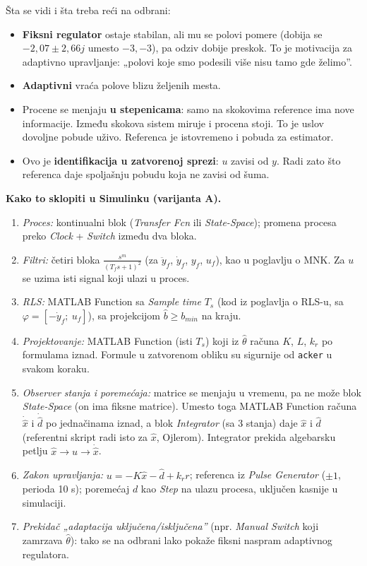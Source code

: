 \documentclass[11pt,a4paper,parskip=half,headsepline,numbers=noenddot]{scrartcl}
\begin{document}
Šta se vidi i šta treba reći na odbrani:

\begin{itemize}
\item \textbf{Fiksni regulator} ostaje stabilan, ali mu se polovi pomere (dobija se \(-2{,}07 \pm 2{,}66j\) umesto \(-3, -3\)), pa odziv dobije preskok. To je motivacija za adaptivno upravljanje: „polovi koje smo podesili više nisu tamo gde želimo''.
\item \textbf{Adaptivni} vraća polove blizu željenih mesta.
\item Procene se menjaju \textbf{u stepenicama}: samo na skokovima reference ima nove informacije. Između skokova sistem miruje i procena stoji. To je uslov dovoljne pobude uživo. Referenca je istovremeno i pobuda za estimator.
\item Ovo je \textbf{identifikacija u zatvorenoj sprezi}: \(u\) zavisi od \(y\). Radi zato što referenca daje spoljašnju pobudu koja ne zavisi od šuma.
\end{itemize}

\textbf{Kako to sklopiti u Simulinku (varijanta A).}

\begin{enumerate}
\def\labelenumi{\arabic{enumi}.}
\item \emph{Proces:} kontinualni blok (\emph{Transfer Fcn} ili \emph{State-Space}); promena procesa preko \emph{Clock} + \emph{Switch} između dva bloka.
\item \emph{Filtri:} četiri bloka \(\frac{s^m}{(T_fs+1)^2}\) (za \(\ddot y_f\), \(\dot y_f\), \(y_f\), \(u_f\)), kao u poglavlju o MNK. Za \(u\) se uzima isti signal koji ulazi u proces.
\item \emph{RLS:} MATLAB Function sa \emph{Sample time} \(T_s\) (kod iz poglavlja o RLS-u, sa \(\varphi = [-\dot y_f;\ u_f]\)), sa projekcijom \(\hat b \ge b_{min}\) na kraju.
\item \emph{Projektovanje:} MATLAB Function (isti \(T_s\)) koji iz \(\hat\theta\) računa \(K\), \(L\), \(k_r\) po formulama iznad. Formule u zatvorenom obliku su sigurnije od \texttt{acker} u svakom koraku.
\item \emph{Observer stanja i poremećaja:} matrice se menjaju u vremenu, pa ne može blok \emph{State-Space} (on ima fiksne matrice). Umesto toga MATLAB Function računa \(\dot{\hat x}\) i \(\dot{\hat d}\) po jednačinama iznad, a blok \emph{Integrator} (sa 3 stanja) daje \(\hat x\) i \(\hat d\) (referentni skript radi isto za \(\hat x\), Ojlerom). Integrator prekida algebarsku petlju \(\hat x \to u \to \dot{\hat x}\).
\item \emph{Zakon upravljanja:} \(u = -K\hat x - \hat d + k_rr\); referenca iz \emph{Pulse Generator} (\(\pm1\), perioda 10 s); poremećaj \(d\) kao \emph{Step} na ulazu procesa, uključen kasnije u simulaciji.
\item \emph{Prekidač „adaptacija uključena/isključena''} (npr. \emph{Manual Switch} koji zamrzava \(\hat\theta\)): tako se na odbrani lako pokaže fiksni naspram adaptivnog regulatora.
\end{enumerate}
\end{document}
